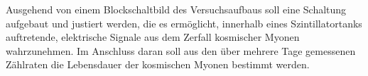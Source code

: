 \noindent Ausgehend von einem Blockschaltbild des Versuchsaufbaus soll eine
Schaltung aufgebaut und justiert werden, die es ermöglicht, innerhalb eines
Szintillatortanks auftretende, elektrische Signale aus dem Zerfall kosmischer
Myonen wahrzunehmen. Im Anschluss daran soll aus den über mehrere Tage
gemessenen Zählraten die Lebensdauer der kosmischen Myonen bestimmt werden.
